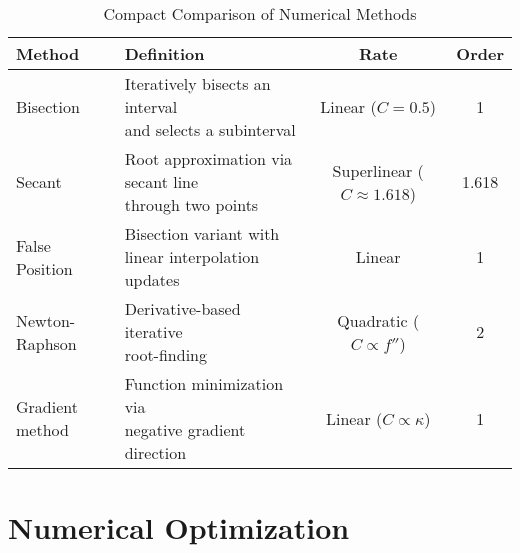 \begin{table}[htbp]
    \centering
    \begin{tabularx}{\textwidth}{|l|X|c|c|}
        \hline
        \textbf{Method} & \textbf{Definition} & \textbf{Rate} & \textbf{Order} \\
        \hline
        Bisection & 
        \makecell[l]{Iteratively bisects an interval \\ and selects a subinterval} 
        & Linear ($C = 0.5$) & 1 \\
        \hline
        Secant & 
        \makecell[l]{Root approximation via secant line \\ through two points} 
        & Superlinear ($C \approx 1.618$) & 1.618 \\
        \hline
        False Position & 
        \makecell[l]{Bisection variant with \\ linear interpolation updates} 
        & Linear & 1 \\
        \hline
        Newton-Raphson & 
        \makecell[l]{Derivative-based iterative \\ root-finding} 
        & Quadratic ($C \propto f''$) & 2 \\
        \hline
        Gradient method & 
        \makecell[l]{Function minimization via \\ negative gradient direction} 
        & Linear ($C \propto \kappa$) & 1 \\
        \hline
    \end{tabularx}
    \caption{Compact Comparison of Numerical Methods}
    \label{tab:comparison_compact}
\end{table}

\section{Numerical Optimization}

%







